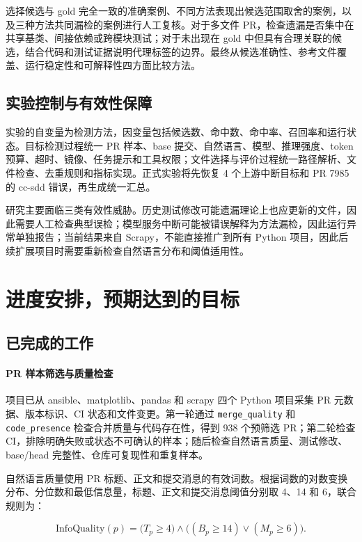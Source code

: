 选择候选与 gold 完全一致的准确案例、不同方法表现出候选范围取舍的案例，以及三种方法共同漏检的案例进行人工复核。对于多文件 PR，检查遗漏是否集中在共享基类、间接依赖或跨模块测试；对于未出现在 gold 中但具有合理关联的候选，结合代码和测试证据说明代理标签的边界。最终从候选准确性、参考文件覆盖、运行稳定性和可解释性四方面比较方法。

\subsection{实验控制与有效性保障}

实验的自变量为检测方法，因变量包括候选数、命中数、命中率、召回率和运行状态。目标检测过程统一 PR 样本、base 提交、自然语言、模型、推理强度、token 预算、超时、镜像、任务提示和工具权限；文件选择与评价过程统一路径解析、文件检查、去重规则和指标实现。正式实验将先恢复 4 个上游中断目标和 PR 7985 的 cc-sdd 错误，再生成统一汇总。

研究主要面临三类有效性威胁。历史测试修改可能遗漏理论上也应更新的文件，因此需要人工检查典型误检；模型服务中断可能被错误解释为方法漏检，因此运行异常单独报告；当前结果来自 Scrapy，不能直接推广到所有 Python 项目，因此后续扩展项目时需要重新检查自然语言分布和阈值适用性。

\section{进度安排，预期达到的目标}

\subsection{已完成的工作}

\paragraph{PR 样本筛选与质量检查}

项目已从 ansible、matplotlib、pandas 和 scrapy 四个 Python 项目采集 PR 元数据、版本标识、CI 状态和文件变更。第一轮通过 \texttt{merge\_quality} 和 \texttt{code\_presence} 检查合并质量与代码存在性，得到 938 个预筛选 PR；第二轮检查 CI，排除明确失败或状态不可确认的样本；随后检查自然语言质量、测试修改、base/head 完整性、仓库可复现性和重复样本。

自然语言质量使用 PR 标题、正文和提交消息的有效词数。根据词数的对数变换分布、分位数和最低信息量，标题、正文和提交消息阈值分别取 4、14 和 6，联合规则为：

\[
  \mathrm{InfoQuality}(p)=
  \bigl(T_p\geq4\bigr)\land
  \bigl((B_p\geq14)\lor(M_p\geq6)\bigr).
\]

